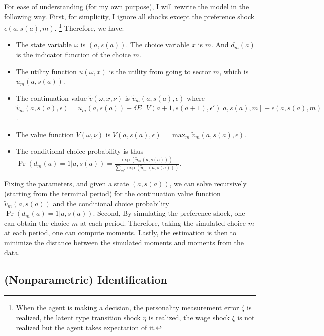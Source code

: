\documentclass[12pt]{article}
\begin{document}
For ease of understanding (for my own purpose), I will rewrite the model in the following way. First, for simplicity, I ignore all shocks except the preference shock $\epsilon(a,s(a), m)$. \footnote{When the agent is making a decision, the personality measurement error $\zeta$ is realized, the latent type transition shock $\eta$ is realized, the wage shock $\xi$ is not realized but the agent takes expectation of it.} Therefore, we have:
\begin{itemize}
    \item The state variable $\omega$ is $(a, s(a))$. The choice variable $x$ is $m$. And $d_m(a)$ is the indicator function of the choice $m$.
    \item The utility function $u(\omega, x)$ is the utility from going to sector $m$, which is $u_m(a, s(a))$.
    \item The continuation value $\tilde{v}(\omega, x, \nu)$ is $\tilde{v}_m(a, s(a),\epsilon)$ where $\tilde{v}_m(a, s(a),\epsilon) = u_m(a, s(a)) + \delta E[V(a+1, s(a+1), \epsilon')|a, s(a), m] + \epsilon(a, s(a), m)$.
    \item The value function $V(\omega, \nu)$ is $V(a, s(a), \epsilon) = \max_m \tilde{v}_m(a, s(a), \epsilon)$.
    \item The conditional choice probability is thus $\Pr(d_m(a) = 1 | a, s(a)) = \frac{\exp(\tilde{u}_m(a, s(a)))}{\sum_{m'} \exp(\tilde{u}_{m'}(a, s(a)))}$.
\end{itemize}
Fixing the parameters, and given a state $(a, s(a))$, we can solve recursively (starting from the terminal period) for the continuation value function $\tilde{v}_m(a, s(a))$ and the conditional choice probability $\Pr(d_m(a) = 1 | a, s(a))$. Second, By simulating the preference shock, one can obtain the choice $m$ at each period. Therefore, taking the simulated choice $m$ at each period, one can compute moments. Lastly, the estimation is then to minimize the distance between the simulated moments and moments from the data.

\subsection{(Nonparametric) Identification}
\end{document}
